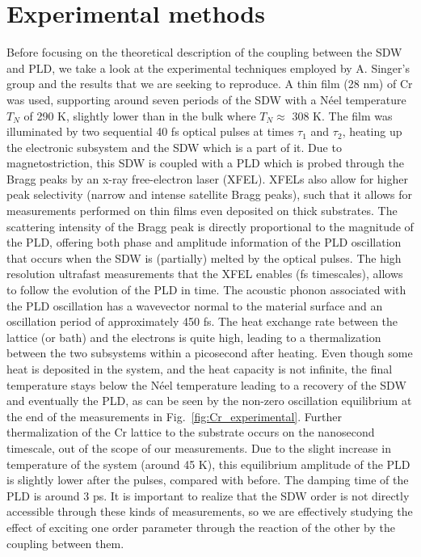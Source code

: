 \section{Experimental methods}
Before focusing on the theoretical description of the coupling between the SDW and PLD, we take a look at the experimental techniques employed by A. Singer's group and the results that we are seeking to reproduce.
A thin film (28 nm) of Cr was used, supporting around seven periods of the SDW with a N\'eel temperature $T_N$ of 290 K, slightly lower than in the bulk where $T_N\approx$ 308 K.
The film was illuminated by two sequential 40 fs optical pulses at times $\tau_1$ and $\tau_2$, heating up the electronic subsystem and the SDW which is a part of it.
Due to magnetostriction, this SDW is coupled with a PLD which is probed through the Bragg peaks by an x-ray free-electron laser (XFEL)\cite{Singer2015}.
XFELs also allow for higher peak selectivity (narrow and intense satellite Bragg peaks), such that it allows for measurements performed on thin films even deposited on thick substrates.
The scattering intensity of the Bragg peak is directly proportional to the magnitude of the PLD, offering both phase and amplitude information of the PLD oscillation that occurs when the SDW is (partially) melted by the optical pulses.
The high resolution ultrafast measurements that the XFEL enables (fs timescales), allows to follow the evolution of the PLD in time.
The acoustic phonon associated with the PLD oscillation has a wavevector normal to the material surface and an oscillation period of approximately 450 fs.
The heat exchange rate between the lattice (or bath) and the electrons is quite high, leading to a thermalization between the two subsystems within a picosecond after heating.
Even though some heat is deposited in the system, and the heat capacity is not infinite, the final temperature stays below the N\'eel temperature leading to a recovery of the SDW and eventually the PLD, as can be seen by the non-zero oscillation equilibrium at the end of the measurements in Fig.~\ref{fig:Cr_experimental}.
Further thermalization of the Cr lattice to the substrate occurs on the nanosecond timescale, out of the scope of our measurements.
Due to the slight increase in temperature of the system (around 45 K), this equilibrium amplitude of the PLD is slightly lower after the pulses, compared with before.
The damping time of the PLD is around 3 ps.
It is important to realize that the SDW order is not directly accessible through these kinds of measurements, so we are effectively studying the effect of exciting one order parameter through the reaction of the other by the coupling between them.

